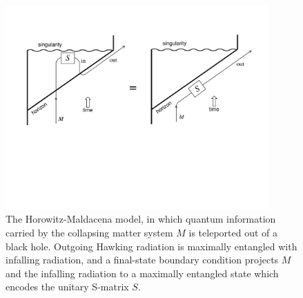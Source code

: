 \documentclass[11pt]{article}
\begin{document}
\begin{figure}[t]
\begin{center}
\includegraphics[width=0.9\textwidth]{penrose.pdf}
\end{center}
\caption{The Horowitz-Maldacena model, in which quantum information carried by the collapsing matter system $M$ is teleported out of a black hole. Outgoing Hawking radiation is maximally entangled with infalling radiation, and a final-state boundary condition projects $M$ and the infalling radiation to a maximally entangled state which encodes the unitary S-matrix $S$.  }
\label{fig:penrose}
\end{figure}
\end{document}
